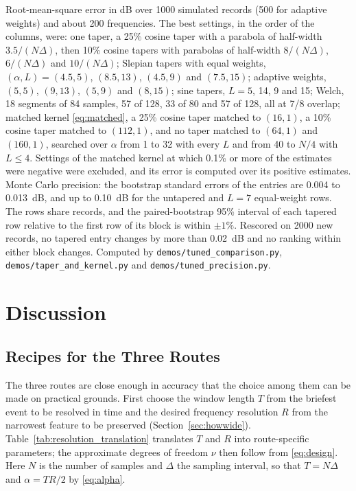 \documentclass[10pt,twocolumn]{article}
\begin{document}
\begin{table}[!t]
\vspace{3pt}
\parbox{0.92\textwidth}{\footnotesize Root-mean-square error in dB over 1000 simulated records (500 for adaptive weights) and about 200 frequencies. The best settings, in the order of the columns, were: one taper, a 25\% cosine taper with a parabola of half-width $3.5/(N\Delta)$, then 10\% cosine tapers with parabolas of half-width $8/(N\Delta)$, $6/(N\Delta)$ and $10/(N\Delta)$; Slepian tapers with equal weights, $(\alpha,L)=(4.5,5)$, $(8.5,13)$, $(4.5,9)$ and $(7.5,15)$; adaptive weights, $(5,5)$, $(9,13)$, $(5,9)$ and $(8,15)$; sine tapers, $L=5$, 14, 9 and 15; Welch, 18 segments of 84 samples, 57 of 128, 33 of 80 and 57 of 128, all at 7/8 overlap; matched kernel \eqref{eq:matched}, a 25\% cosine taper matched to $(16,1)$, a 10\% cosine taper matched to $(112,1)$, and no taper matched to $(64,1)$ and $(160,1)$, searched over $\alpha$ from 1 to 32 with every $L$ and from 40 to $N/4$ with $L\le4$. Settings of the matched kernel at which 0.1\% or more of the estimates were negative were excluded, and its error is computed over its positive estimates. Monte Carlo precision: the bootstrap standard errors of the entries are 0.004 to 0.013~dB, and up to 0.10~dB for the untapered and $L=7$ equal-weight rows. The rows share records, and the paired-bootstrap 95\% interval of each tapered row relative to the first row of its block is within $\pm1\%$. Rescored on 2000 new records, no tapered entry changes by more than 0.02~dB and no ranking within either block changes. Computed by \texttt{demos/tuned\_comparison.py}, \texttt{demos/taper\_and\_kernel.py} and \texttt{demos/tuned\_precision.py}.}
\end{table}


\section{Discussion}
\label{sec:discussion}

\subsection{Recipes for the Three Routes}
\label{sec:recipe}
The three routes are close enough in accuracy that the choice among them can be made on practical grounds. First choose the window length $T$ from the briefest event to be resolved in time and the desired frequency resolution $R$ from the narrowest feature to be preserved (Section~\ref{sec:howwide}). Table~\ref{tab:resolution_translation} translates $T$ and $R$ into route-specific parameters; the approximate degrees of freedom $\nu$ then follow from \eqref{eq:design}. Here $N$ is the number of samples and $\Delta$ the sampling interval, so that $T=N\Delta$ and $\alpha=TR/2$ by \eqref{eq:alpha}.
\end{document}
